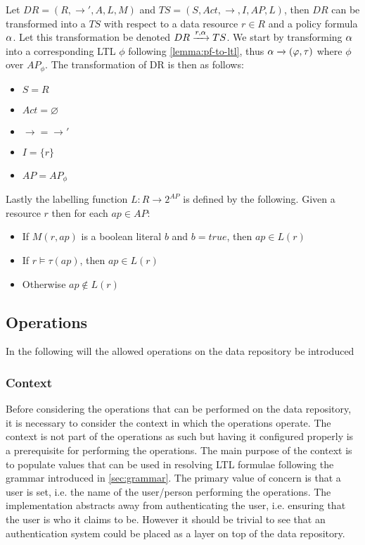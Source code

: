 
\begin{lemma}\label{lemma:dr-to-ts}
Let $DR=\left(R, \longrightarrow', A, L, M \right)$ and $TS=\left(S, Act, \longrightarrow, I, AP, L \right)$, then $DR$ can be transformed into a $TS$ with respect to a data resource $r \in R$ and a policy formula $\alpha$. Let this transformation be denoted $DR \xrightarrow{r,\alpha} TS$. We start by transforming $\alpha$ into a corresponding LTL $\phi$ following \autoref{lemma:pf-to-ltl}, thus $\alpha \xrightarrow{} \left(\varphi, \tau\right)$ where $\phi$ over $AP_\phi$. The transformation of DR is then as follows:
\begin{itemize}
  \item $S = R$
  \item $Act = \varnothing$
  \item $\longrightarrow = \longrightarrow'$
  \item $I = \{r\}$
  \item $AP = AP_\phi$
\end{itemize}
Lastly the labelling function $L: R \rightarrow 2^{AP}$ is defined by the following. Given a resource $r$ then for each $ap \in AP$:
\begin{itemize}
    \item If $M(r, ap)$ is a boolean literal $b$ and $b = true$, then $ap \in L(r)$
    \item If $r \models \tau(ap)$, then $ap \in L(r)$
    \item Otherwise $ap \not\in L(r)$
\end{itemize}
\end{lemma}





\subsection{Operations}
In the following will the allowed operations on the data repository be introduced
\subsubsection{Context}
Before considering the operations that can be performed on the data repository, it is necessary to consider the context in which the operations operate. The context is not part of the operations as such but having it configured properly is a prerequisite for performing the operations. The main purpose of the context is to populate values that can be used in resolving LTL formulae following the grammar introduced in \autoref{sec:grammar}. The primary value of concern is that a user is set, i.e. the name of the user/person performing the operations. The implementation abstracts away from authenticating the user, i.e. ensuring that the user is who it claims to be. However it should be trivial to see that an authentication system could be placed as a layer on top of the data repository.

